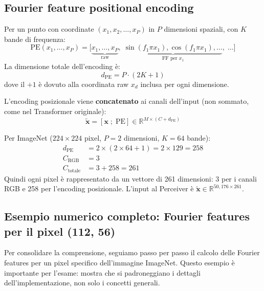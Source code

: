 \documentclass[12pt,a4paper]{article}
\begin{document}
\subsection{Fourier feature positional encoding} \label{sec:fourier_encoding}

\begin{formulabox}
Per un punto con coordinate $(x_1, x_2, \ldots, x_P)$ in $P$ dimensioni spaziali, con $K$ bande di frequenza:
\[
    \text{PE}(x_1, \ldots, x_P) = \Big[\underbrace{x_1, \ldots, x_P}_{\text{raw}},\;
    \underbrace{\sin(f_1 \pi x_1), \cos(f_1 \pi x_1), \ldots}_{\text{FF per } x_1},\; \ldots\Big]
\]
La dimensione totale dell'encoding \`e:
\[
    d_{\text{PE}} = P \cdot (2K + 1)
\]
dove il $+1$ \`e dovuto alla coordinata raw $x_d$ inclusa per ogni dimensione.
\end{formulabox}

L'encoding posizionale viene \textbf{concatenato} ai canali dell'input (non sommato, come nel Transformer originale):
\[
    \tilde{\mathbf{x}} = [\mathbf{x} \;;\; \text{PE}] \in \mathbb{R}^{M \times (C + d_{\text{PE}})}
\]

\begin{examplebox}
Per ImageNet ($224 \times 224$ pixel, $P = 2$ dimensioni, $K = 64$ bande):
\begin{align*}
    d_{\text{PE}} &= 2 \times (2 \times 64 + 1) = 2 \times 129 = 258 \\
    C_{\text{RGB}} &= 3 \\
    C_{\text{totale}} &= 3 + 258 = 261
\end{align*}
Quindi ogni pixel \`e rappresentato da un vettore di 261 dimensioni: 3 per i canali RGB e 258 per l'encoding posizionale. L'input al Perceiver \`e $\tilde{\mathbf{x}} \in \mathbb{R}^{50{,}176 \times 261}$.
\end{examplebox}

\subsection{Esempio numerico completo: Fourier features per il pixel (112, 56)} \label{sec:fourier_numerico}

Per consolidare la comprensione, seguiamo passo per passo il calcolo delle Fourier features per un pixel specifico dell'immagine ImageNet. Questo esempio \`e importante per l'esame: mostra che si padroneggiano i dettagli dell'implementazione, non solo i concetti generali.
\end{document}
